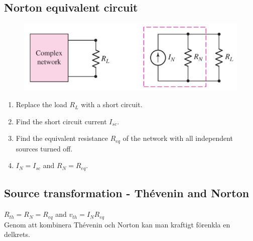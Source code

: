 \subsection{Norton equivalent circuit}

\begin{figure}[H]
    \centering
        \includegraphics[scale=0.5]{norton.png}
    \label{fig:norton}
\end{figure}

\begin{enumerate}
    \item Replace the load \(R_L\) with a short circuit.
    \item Find the short circuit current \(I_{sc}\).
    \item Find the equivalent resistance \(R_{eq}\) of the network with all independent sources turned off.
    \item \(I_N = I_{sc}\) and \(R_N = R_{eq}\).
\end{enumerate}

\subsection{Source transformation - Thévenin and Norton}
\(R_{th} = R_N = R_{eq}\) and \(v_{th} = I_NR_{eq}\)
\\
Genom att kombinera Thévenin och Norton kan man kraftigt förenkla en delkrets.
